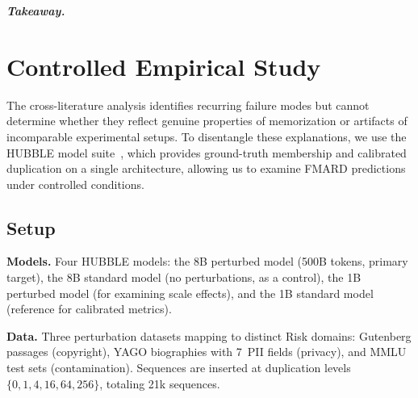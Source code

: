 \documentclass[11pt]{article}
\begin{document}
\textit{\textbf{Takeaway.}}


\section{Controlled Empirical Study}
\label{sec:empirical}

The cross-literature analysis identifies recurring failure modes but cannot
determine whether they reflect genuine properties of memorization or artifacts
of incomparable experimental setups.
To disentangle these explanations, we use the HUBBLE model
suite~\citep{wei2025hubble}, which provides ground-truth membership and
calibrated duplication on a single architecture, allowing us to examine FMARD
predictions under controlled conditions.

\subsection{Setup}

\textbf{Models.}
Four HUBBLE models: the 8B perturbed model (500B tokens, primary target), the
8B standard model (no perturbations, as a control), the 1B perturbed model
(for examining scale effects), and the 1B standard model (reference for
calibrated metrics).

\textbf{Data.}
Three perturbation datasets mapping to distinct Risk domains: Gutenberg
passages (copyright), YAGO biographies with 7~PII fields (privacy), and MMLU
test sets (contamination).
Sequences are inserted at duplication levels $\{0, 1, 4, 16, 64, 256\}$,
totaling 21k sequences.
\end{document}
